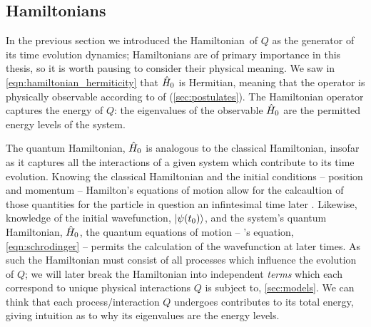 \subsection{Hamiltonians}\label{sec:hamiltonians}
In the previous section we introduced the Hamiltonian\footnotemark \ of $Q$ as the generator of its 
    time evolution dynamics;
    Hamiltonians are of primary importance in this thesis, so it is worth pausing to consider their physical meaning. 
We saw in \cref{eqn:hamiltonian_hermiticity} that $\hat{H}_0$ is Hermitian, 
    meaning that the operator is physically observable 
    according to 
    of  (\cref{sec:postulates}). 
The Hamiltonian operator captures the energy of $Q$: 
    the eigenvalues of the observable $\hat{H}_0$ are the permitted energy levels of the system.
\par 

The quantum Hamiltonian, $\hat{H}_0$ is analogous to the classical Hamiltonian, 
    insofar as it captures all the interactions of a given system which contribute to its time evolution.
Knowing the classical Hamiltonian and the initial conditions -- position and momentum -- 
    Hamilton's equations of motion allow for the calcaultion of those quantities for the particle 
    in question an infintesimal time later \cite{susskind2014classical}.    
Likewise, knowledge of the initial wavefunction, $\ket{\psi(t_0)}$, and the system's quantum Hamiltonian, $\hat{H}_0$, 
    the quantum equations of motion -- \schrodinger's equation, \cref{eqn:schrodinger} -- 
    permits the calculation of the wavefunction at later times.
As such the Hamiltonian must consist of all processes which influence the evolution of $Q$;
    we will later break the Hamiltonian into independent \emph{terms} which each correspond to unique physical interactions
    $Q$ is subject to, \cref{sec:models}. 
We can think that each process/interaction $Q$ undergoes contributes to its total energy,
    giving intuition as to why its eigenvalues are the energy levels. 
\par 
{}


